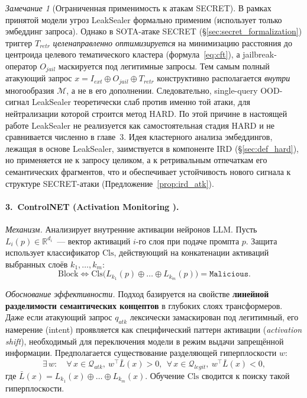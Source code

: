 \documentclass[12pt, a4paper]{article}
\theoremstyle{definition}
\theoremstyle{remark}
\newtheorem*{remark}{Замечание}
\begin{document}
\begin{remark}[Ограниченная применимость к атакам SECRET]
\label{rem:leaksealer_limit}
В рамках принятой модели угроз LeakSealer формально применим (использует только эмбеддинг запроса). Однако в SOTA-атаке SECRET (\S\ref{sec:secret_formalization}) триггер $T_{retr}$ \textit{целенаправленно оптимизируется} на минимизацию расстояния до центроида целевого тематического кластера (формула~\eqref{eq:cft}), а jailbreak-оператор $O_{jail}$ маскируется под легитимные запросы. Тем самым полный атакующий запрос $x = I_{ext} \oplus O_{jail} \oplus T_{retr}$ конструктивно располагается \textit{внутри} многообразия $\mathcal{M}$, а не в его дополнении. Следовательно, single-query OOD-сигнал LeakSealer теоретически слаб против именно той атаки, для нейтрализации которой строится метод HARD. По этой причине в настоящей работе LeakSealer не реализуется как самостоятельная стадия HARD и не сравнивается численно в главе~3. Идея кластерного анализа эмбеддингов, лежащая в основе LeakSealer, заимствуется в компоненте IRD (\S\ref{sec:def_hard}), но применяется не к запросу целиком, а к ретривальным отпечаткам его семантических фрагментов, что и обеспечивает устойчивость нового сигнала к структуре SECRET-атаки (Предложение~\ref{prop:ird_atk}).
\end{remark}

\paragraph{3.~ControlNET (Activation Monitoring \cite{ControlNET2025}).}

\textit{Механизм.} Анализирует внутренние активации нейронов LLM. Пусть $L_i(p) \in \mathbb{R}^{d_i}$~--- вектор активаций $i$-го слоя при подаче промпта $p$. Защита использует классификатор $\mathrm{Cls}$, действующий на конкатенации активаций выбранных слоёв $k_1, \dots, k_m$:
\begin{equation}
    \text{Block} \iff \mathrm{Cls}\bigl(L_{k_1}(p) \oplus \dots \oplus L_{k_m}(p)\bigr) = \texttt{Malicious}.
\end{equation}

\textit{Обоснование эффективности.} Подход базируется на свойстве \textbf{линейной разделимости семантических концептов} в глубоких слоях трансформеров. Даже если атакующий запрос $q_{atk}$ лексически замаскирован под легитимный, его намерение (intent) проявляется как специфический паттерн активации (\textit{activation shift}), необходимый для переключения модели в режим выдачи запрещённой информации. Предполагается существование разделяющей гиперплоскости $w$:
\begin{equation}
    \exists\, w: \quad \forall\, x \in \mathcal{Q}_{atk},\ w^{\top} \bar{L}(x) > 0,\ \
    \forall\, x \in \mathcal{Q}_{legit},\ w^{\top} \bar{L}(x) < 0,
\end{equation}
где $\bar{L}(x) = L_{k_1}(x) \oplus \dots \oplus L_{k_m}(x)$. Обучение $\mathrm{Cls}$ сводится к поиску такой гиперплоскости.
\end{document}

